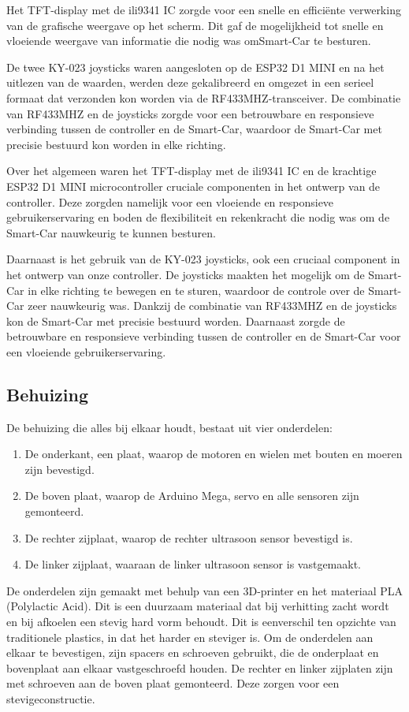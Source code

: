 Het \gls{TFT-display} met de \gls{ili9341}\cite{ILI3941} IC zorgde voor een snelle en efficiënte verwerking van de grafische weergave op het scherm. Dit gaf de mogelijkheid tot snelle en vloeiende weergave van informatie die nodig was om\gls{Smart-Car} te besturen.

De twee KY-023\cite{KY023} joysticks waren aangesloten op de ESP32\cite{ESP32} D1 MINI en na het uitlezen van de waarden, werden deze gekalibreerd en omgezet in een serieel formaat dat verzonden kon worden via de \gls{RF433MHZ}-transceiver. De combinatie van \gls{RF433MHZ} en de joysticks zorgde voor een betrouwbare en responsieve verbinding tussen de controller en de \gls{Smart-Car}, waardoor de \gls{Smart-Car} met precisie bestuurd kon worden in elke richting.

Over het algemeen waren het \gls{TFT-display} met de \gls{ili9341}\cite{ILI3941} IC en de krachtige ESP32\cite{ESP32} D1 MINI \gls{microcontroller} cruciale componenten in het ontwerp van de controller. Deze zorgden namelijk voor een vloeiende en responsieve gebruikerservaring en boden de flexibiliteit en rekenkracht die nodig was om de \gls{Smart-Car} nauwkeurig te kunnen besturen.

Daarnaast is het gebruik van de KY-023\cite{KY023} joysticks, ook een cruciaal component in het ontwerp van onze controller. De joysticks maakten het mogelijk om de \gls{Smart-Car} in elke richting te bewegen en te sturen, waardoor de controle over de \gls{Smart-Car} zeer nauwkeurig was. Dankzij de combinatie van \gls{RF433MHZ} en de joysticks kon de \gls{Smart-Car} met precisie bestuurd worden. Daarnaast zorgde de betrouwbare en responsieve verbinding tussen de controller en de \gls{Smart-Car} voor een vloeiende gebruikerservaring.

\subsection{Behuizing}
De behuizing die alles bij elkaar houdt, bestaat uit vier onderdelen:
\begin{enumerate}
\item De onderkant, een plaat, waarop de motoren en wielen met bouten en moeren zijn bevestigd.\item De boven plaat, waarop de Arduino Mega, servo en alle sensoren zijn gemonteerd.
\item De rechter zijplaat, waarop de rechter ultrasoon sensor bevestigd is.
\item De linker zijplaat, waaraan de linker ultrasoon sensor is vastgemaakt.
\end{enumerate}
De onderdelen zijn gemaakt met behulp van een 3D-printer en het materiaal PLA (Polylactic Acid). Dit is een duurzaam materiaal dat bij verhitting zacht wordt en bij afkoelen een stevig hard vorm behoudt. Dit is eenverschil ten opzichte van traditionele plastics, in dat het harder en steviger is. Om de onderdelen aan elkaar te bevestigen, zijn spacers en schroeven gebruikt, die de onderplaat en bovenplaat aan elkaar vastgeschroefd houden. De rechter en linker zijplaten zijn met schroeven aan de boven plaat gemonteerd. Deze zorgen voor een stevigeconstructie.
